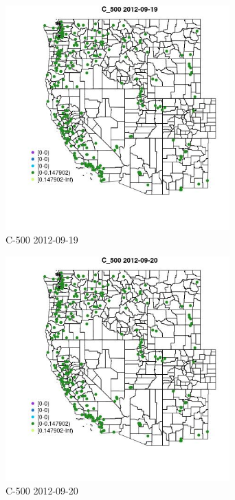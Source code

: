 \clearpage 

\begin{figure} 
\centering  
\includegraphics[width=0.77\textwidth]{Code_Outputs/ML_input_report_ML_input_PM25_Step5_part_d_de_duplicated_aves_ML_input_MapObsC_5002012-09-19.jpg} 
\caption{\label{fig:ML_input_report_ML_input_PM25_Step5_part_d_de_duplicated_aves_ML_inputMapObsC_5002012-09-19}C-500 2012-09-19} 
\end{figure} 
 

\begin{figure} 
\centering  
\includegraphics[width=0.77\textwidth]{Code_Outputs/ML_input_report_ML_input_PM25_Step5_part_d_de_duplicated_aves_ML_input_MapObsC_5002012-09-20.jpg} 
\caption{\label{fig:ML_input_report_ML_input_PM25_Step5_part_d_de_duplicated_aves_ML_inputMapObsC_5002012-09-20}C-500 2012-09-20} 
\end{figure} 
 

